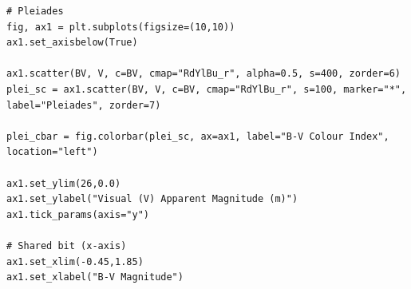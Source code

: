 \documentclass[12pt]{article}
\begin{document}
%

\begin{minipage}{\linewidth}
\captionsetup{hypcap=false}

\begin{mintedbox}
\begin{verbatim}
# Pleiades
fig, ax1 = plt.subplots(figsize=(10,10))
ax1.set_axisbelow(True)

ax1.scatter(BV, V, c=BV, cmap="RdYlBu_r", alpha=0.5, s=400, zorder=6)
plei_sc = ax1.scatter(BV, V, c=BV, cmap="RdYlBu_r", s=100, marker="*", label="Pleiades", zorder=7)

plei_cbar = fig.colorbar(plei_sc, ax=ax1, label="B-V Colour Index", location="left")

ax1.set_ylim(26,0.0)
ax1.set_ylabel("Visual (V) Apparent Magnitude (m)")
ax1.tick_params(axis="y")

# Shared bit (x-axis)
ax1.set_xlim(-0.45,1.85)
ax1.set_xlabel("B-V Magnitude")

\end{verbatim}
\end{mintedbox}

\end{minipage}
\end{document}
